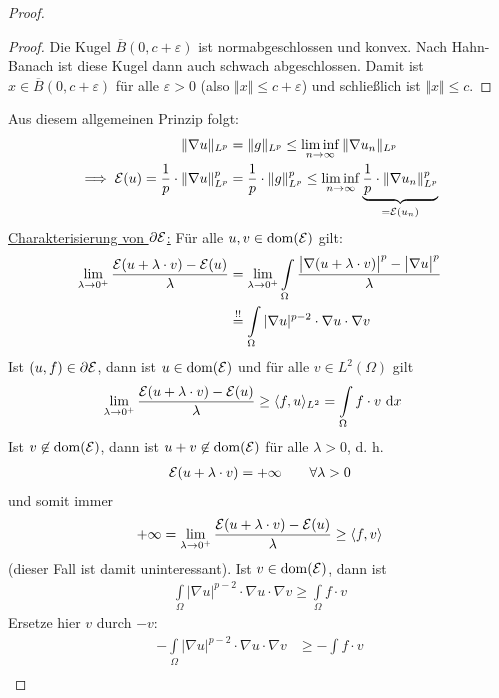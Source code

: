 \begin{beispiel}
\begin{proof}
		\begin{proof}
			Die Kugel $\overline{B}(0,c+\varepsilon)$ ist normabgeschlossen und konvex. Nach Hahn-Banach ist diese Kugel dann auch schwach abgeschlossen.
Damit ist $x\in\overline{B}(0,c+\varepsilon)$ für alle $\varepsilon>0$ (also $\Vert x\Vert\leq c+\varepsilon$) und schließlich ist $\Vert x\Vert\leq c$.
\end{proof}
Aus diesem allgemeinen Prinzip folgt:
\begin{align*}
\Vert\nabla u\Vert_{L^p}&=\Vert g\Vert_{L^p}\leq\liminf\limits_{n\to\infty}\Vert \nabla u_n\Vert_{L^p}\\
\implies
\mathcal{E}(u)=\frac{1}{p}\cdot\Vert\nabla u\Vert_{L^p}^p&=\frac{1}{p}\cdot\Vert g\Vert_{L^p}^p\leq\liminf\limits_{n\to\infty}\underbrace{\frac{1}{p}\cdot\Vert \nabla u_n\Vert_{L^p}^p}_{=\mathcal{E}(u_n)}
\end{align*}
\underline{Charakterisierung von $\partial\mathcal{E}$:} 
Für alle $u,v\in\operatorname{dom}(\mathcal{E})$ gilt:
\begin{align*}
\lim\limits_{\lambda\to 0^+}\frac{\mathcal{E}(u+\lambda\cdot v)-\mathcal{E}(u)}{\lambda}&=\lim\limits_{\lambda\to 0^+}\int\limits_\Omega\frac{\big|\nabla(u+\lambda\cdot v)\big|^p-\big|\nabla u\big|^p}{\lambda}\\
&\stackrel{!!}{=}
\int\limits_\Omega|\nabla u|^{p-2}\cdot\nabla u\cdot\nabla v
\end{align*}
Ist $(u,f)\in\partial\mathcal{E}$, dann ist $u\in\operatorname{dom}(\mathcal{E})$ und für alle $v\in L^2(\Omega)$ gilt
\begin{align*}
\lim\limits_{\lambda\to 0^+}\frac{\mathcal{E}(u+\lambda\cdot v)-\mathcal{E}(u)}{\lambda}&\geq\langle f,u\rangle_{L^2}
=\int\limits_\Omega f\cdot v\text{ d} x
\end{align*}
Ist $v\not\in\operatorname{dom}(\mathcal{E})$, dann ist $u+v\not\in\operatorname{dom}(\mathcal{E})$ für alle $\lambda>0$, d. h.
\begin{align*}
\mathcal{E}(u+\lambda\cdot v)=+\infty\qquad\forall\lambda>0
\end{align*}
und somit immer
\begin{align*}
+\infty=\lim\limits_{\lambda\to 0^+}\frac{\mathcal{E}(u+\lambda\cdot v)-\mathcal{E}(u)}{\lambda}\geq\langle f,v\rangle
\end{align*}
(dieser Fall ist damit uninteressant). Ist $v\in\operatorname{dom}(\mathcal{E})$, dann ist 
\begin{align*}
\int\limits_\Omega |\nabla u|^{p-2}\cdot\nabla u\cdot\nabla v\geq\int\limits_\Omega f\cdot v
\end{align*}
Ersetze hier $v$ durch $-v$:
\begin{align*}
-\int\limits_\Omega|\nabla u|^{p-2}\cdot\nabla u\cdot\nabla v&\geq-\int\limits f\cdot v\\

\end{align*}
\end{proof}
\end{beispiel}
